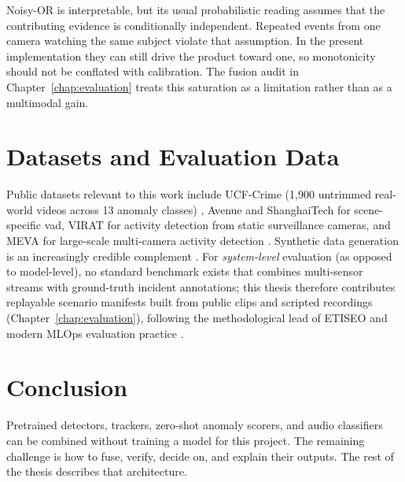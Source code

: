 Noisy-OR is interpretable, but its usual probabilistic reading assumes that
the contributing evidence is conditionally independent. Repeated events from
one camera watching the same subject violate that assumption. In the present
implementation they can still drive the product toward one, so monotonicity
should not be conflated with calibration. The fusion audit in
Chapter~\ref{chap:evaluation} treats this saturation as a limitation rather
than as a multimodal gain.

\section{Datasets and Evaluation Data}

Public datasets relevant to this work include UCF-Crime (1{,}900 untrimmed real-world videos across 13 anomaly classes) \cite{sultani2018ucfcrime}, Avenue and ShanghaiTech for scene-specific \gls{vad}, VIRAT for activity detection from static surveillance cameras, and MEVA for large-scale multi-camera activity detection \cite{tan2025how}. Synthetic data generation is an increasingly credible complement \cite{delussu2024synthetic, riaz2023synthetic, chu2025lfsyngen}. For \emph{system-level} evaluation (as opposed to model-level), no standard benchmark exists that combines multi-sensor streams with ground-truth incident annotations; this thesis therefore contributes replayable scenario manifests built from public clips and scripted recordings (Chapter~\ref{chap:evaluation}), following the methodological lead of ETISEO \cite{nghiem2007etiseo} and modern MLOps evaluation practice \cite{aicity2025}.

\section{Conclusion}

Pretrained detectors, trackers, zero-shot anomaly scorers, and audio classifiers can be combined without training a model for this project. The remaining challenge is how to fuse, verify, decide on, and explain their outputs. The rest of the thesis describes that architecture.
